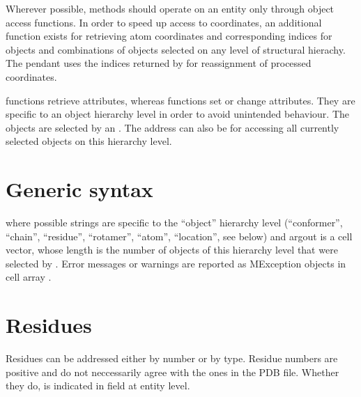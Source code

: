 \documentclass[letterpaper,10pt,english]{sphinxmanual}
\begin{document}
Wherever possible, methods should operate on an entity only through object access functions. In order to speed up access to coordinates,
an additional function  exists for retrieving atom coordinates and corresponding indices for objects and combinations of objects selected on any level of structural hierachy.
The pendant  uses the indices returned by  for reassignment of processed coordinates.

 functions retrieve attributes, whereas  functions set or change attributes. They are specific to an object hierarchy level in order to avoid unintended behaviour.
The objects are selected by an {\hyperref[\detokenize{MMMx_addresses:mmmx-addresses}]{}}. The address can also be  for accessing all currently selected objects on this hierarchy level.


\section{Generic syntax}
\label{\detokenize{object_access:generic-syntax}}
\begin{sphinxVerbatim}[commandchars=\\\{\}]
\PYG{p}{[}\PYG{p}{]}  
\end{sphinxVerbatim}

where possible  strings are specific to the “object” hierarchy level (“conformer”, “chain”, “residue”, “rotamer”, “atom”, “location”, see below) and argout is a cell vector, whose length is the number of objects of this hierarchy level that were selected by .
Error messages or warnings are reported as MException objects in cell array .


\section{Residues}
\label{\detokenize{object_access:residues}}
Residues can be addressed either by number or by type. Residue numbers are positive and do not neccessarily agree with the ones in the PDB file. Whether they do, is indicated in field  at entity level.
\end{document}
